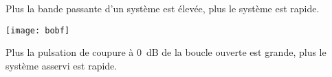 \begin{resultat}
Plus la bande passante d'un système est élevée, plus le système est rapide.
\end{resultat}


\begin{marginfigure}[-2cm]
\centering
\texttt{[image: bobf]}
\end{marginfigure}

\begin{resultat}
Plus la pulsation de coupure à \SI{0}{dB} de la boucle ouverte est grande, plus le système asservi est rapide.
\end{resultat}







